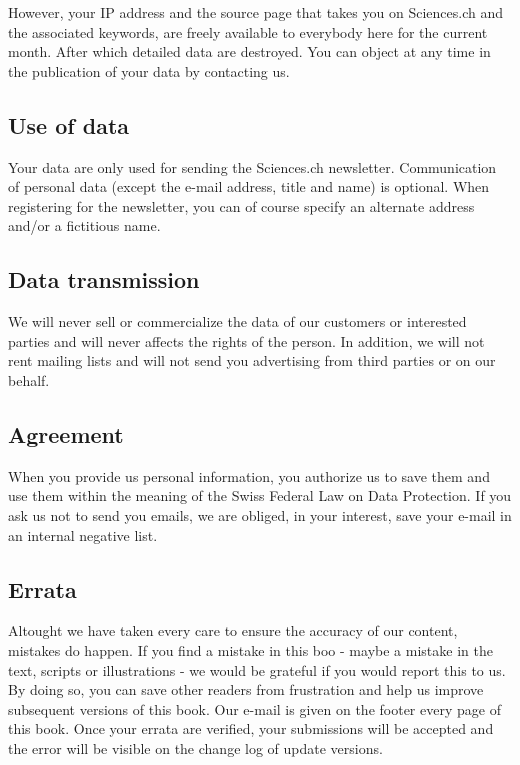 	However, your IP address and the source page that takes you on Sciences.ch and the associated keywords, are freely available to everybody here for the current month. After which detailed data are destroyed. You can object at any time in the publication of your data by contacting us.

	\subsection{Use of data}

	Your data are only used for sending the Sciences.ch newsletter. Communication of personal data (except the e-mail address, title and name) is optional. When registering for the newsletter, you can of course specify an alternate address and/or a fictitious name.

	\subsection{Data transmission}

	We will never sell or commercialize the data of our customers or interested parties and will never affects the rights of the person. In addition, we will not rent mailing lists and will not send you advertising from third parties or on our behalf.

	\subsection{Agreement}

	When you provide us personal information, you authorize us to save them and use them within the meaning of the Swiss Federal Law on Data Protection. If you ask us not to send you emails, we are obliged, in your interest, save your e-mail in an internal negative list.
	
	\subsection{Errata}
	Altought we have taken every care to ensure the accuracy of our content, mistakes do happen. If you find a mistake in this boo - maybe a mistake in the text, scripts or illustrations - we would be grateful if you would report this to us. By doing so, you can save other readers from frustration and help us improve subsequent versions of this book. Our e-mail is given on the footer every page of this book. Once your errata are verified, your submissions will be accepted and the error will be visible on the change log of update versions.

